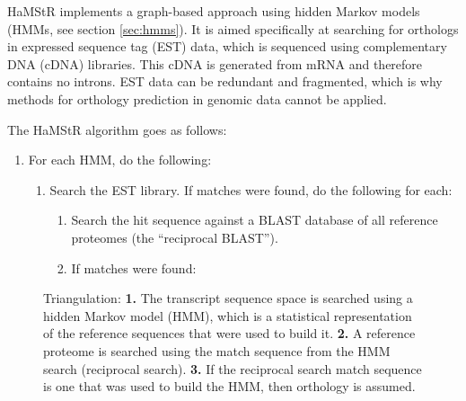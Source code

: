 HaMStR \citep{ebersberger2009} implements a graph-based approach using hidden
Markov models (HMMs, see section \ref{sec:hmms}). It is aimed specifically at
searching for orthologs in expressed sequence tag (EST) data, which is sequenced
using complementary DNA (cDNA) libraries. This cDNA is generated from mRNA and
therefore contains no introns. EST data can be redundant and fragmented, which
is why methods for orthology prediction in genomic data cannot be applied.

The HaMStR algorithm goes as follows:

\begin{enumerate}
	\item For each HMM, do the following:
		\begin{enumerate}
			\item Search the EST library. If matches were found, do the following for
				each:
			\begin{enumerate}
				\item Search the hit sequence against a BLAST database of all reference
					proteomes (the ``reciprocal BLAST''). 
				\item If matches were found: 

			\end{enumerate}
		\end{enumerate}
\end{enumerate}

\begin{figure}[h]
	\centering
	\def\svgwidth{0.8\textwidth}
	
	\caption[Triangulation]{Triangulation:
		\textbf{1.} The transcript sequence space is searched using a hidden Markov
			model (HMM), which is a statistical representation of the reference
			sequences that were used to build it.
		\textbf{2.} A reference proteome is searched using the match sequence from the
			HMM search (reciprocal search).
		\textbf{3.} If the reciprocal search match sequence is one that was used to
			build the HMM, then orthology is assumed.
	}
	\label{fig:hamstr}
\end{figure}

%
